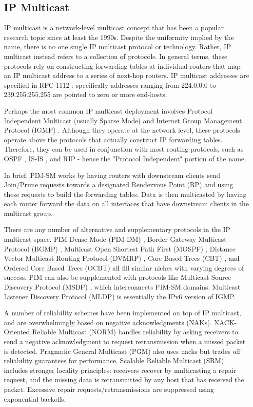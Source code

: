 \subsection{IP Multicast}
IP multicast is a network-level multicast concept that has been a popular research topic since at least the 1990s. Despite the uniformity implied by the name, there is no one single IP multicast protocol or technology. Rather, IP multicast instead refers to a collection of protocols. In general terms, these protocols rely on constructing forwarding tables at individual routers that map an IP multicast address to a series of next-hop routers. IP multicast addresses are specified in RFC 1112 \cite{RFC1112}; specifically addresses ranging from 224.0.0.0 to 239.255.255.255 are pointed to zero or more end-hosts.

Perhaps the most common IP multicast deployment involves Protocol Independent Multicast (usually Sparse Mode) \cite{RFC2362} and Internet Group Management Protocol (IGMP) \cite{RFC4605}. Although they operate at the network level, these protocols operate above the protocols that actually construct IP forwarding tables. Therefore, they can be used in conjunction with most routing protocols, such as OSPF \cite{RFC2328}, IS-IS \cite{ISO10589}, and RIP \cite{RFC2453} - hence the "Protocol Independent" portion of the name. 

In brief, PIM-SM works by having routers with downstream clients send Join/Prune requests towards a designated Rendezvous Point (RP) and using these requests to build the forwarding tables. Data is then multicasted by having each router forward the data on all interfaces that have downstream clients in the multicast group.

There are any number of alternative and supplementary protocols in the IP multicast space. PIM Dense Mode (PIM-DM) \cite{RFC3973}, Border Gateway Multicast Protocol (BGMP) \cite{RFC3913}, Multicast Open Shortest Path First (MOSPF) \cite{RFC1584}, Distance Vector Multicast Routing Protocol (DVMRP) \cite{RFC1075}, Core Based Trees (CBT) \cite{RFC2201}, and Ordered Core Based Trees (OCBT) \cite{OCBT} all fill similar niches with varying degrees of success.  PIM can also be supplemented with protocols like Multicast Source Discovery Protocol (MSDP) \cite{RFC4611}, which interconnects PIM-SM domains. Multicast Listener Discovery Protocol (MLDP) \cite{RFC4604} is essentially the IPv6 version of IGMP.

A number of reliability schemes have been implemented on top of IP multicast, and are overwhelmingly based on negative acknowledgments (NAKs). NACK-Oriented Reliable Multicast (NORM) \cite{RFC5740} handles reliability by asking receivers to send a negative acknowledgment to request retransmission when a missed packet is detected. Pragmatic General Multicast (PGM) \cite{RFC3208} also uses nacks but trades off reliability guarantees for performance. Scalable Reliable Multicast (SRM) \cite{SRM} includes stronger locality principles: receivers recover by multicasting a repair request, and the missing data is retransmitted by any host that has received the packet.  Excessive repair requests/retransmissions are suppressed using exponential backoffs.

